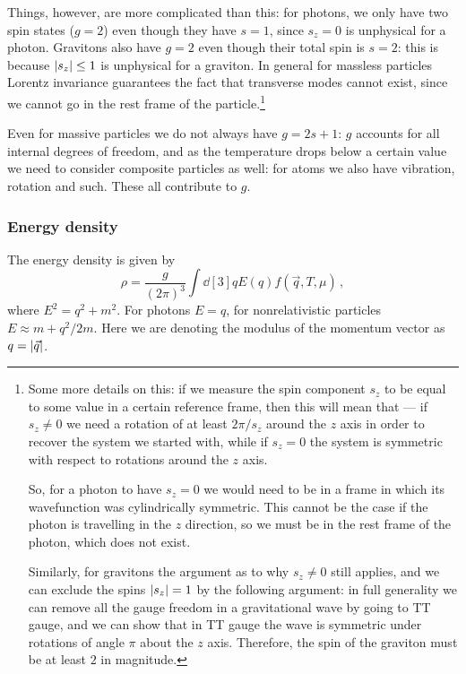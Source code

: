 \documentclass[main.tex]{subfiles}
\begin{document}
Things, however, are more complicated than this: for photons, we only have two spin states (\(g=2\)) even though they have \(s=1\), since \(s_z=0\) is unphysical for a photon. 
Gravitons also have \(g=2\) even though their total spin is \(s=2\): this is because \(\abs{s_z} \leq 1 \) is unphysical for a graviton. 
In general for massless particles Lorentz invariance guarantees the fact that transverse modes cannot exist, since we cannot go in the rest frame of the particle.\footnote{Some more details on this: if we measure the spin component \(s_z\) to be equal to some value in a certain reference frame, then this will mean that --- if \(s_z \neq 0 \) we need a rotation of at least \(2 \pi / s_z\) around the \(z\) axis in order to recover the system we started with, while if \(s_z=0\) the system is symmetric with respect to rotations around the \(z\) axis. 

So, for a photon to have \(s_z=0\) we would need to be in a frame in which its wavefunction was cylindrically symmetric. This cannot be the case if the photon is travelling in the \(z\) direction, so we must be in the rest frame of the photon, which does not exist. 

Similarly, for gravitons the argument as to why \(s_z \neq 0\) still applies, and we can exclude the spins \(\abs{s_z} = 1\) by the following argument: in full generality we can remove all the gauge freedom in a gravitational wave by going to TT gauge, and we can show that in TT gauge the wave is symmetric under rotations of angle \(\pi \) about the \(z\) axis. 
Therefore, the spin of the graviton must be at least \(2\) in magnitude.}

Even for massive particles we do not always have \(g = 2s+1\): \(g\) accounts for all internal degrees of freedom, and as the temperature drops below a certain value we need to consider composite particles as well: for atoms we also have vibration, rotation and such. These all contribute to \(g\). 

\subsubsection{Energy density}

The energy density is given by
%
\begin{equation} \label{eq:energy-density-momentum-space}
  \rho = \frac{g}{(2 \pi )^3} \int \dd[3]{q} E(q) f(\vec{q}, T, \mu ) 
\,,
\end{equation}
%
where \(E^2 = q^2 + m^2\).
For photons \(E = q\), for nonrelativistic particles \(E \approx m + q^2 / 2m\).
Here we are denoting the modulus of the momentum vector as \(q = \abs{\vec{q}}\). 
\end{document}

